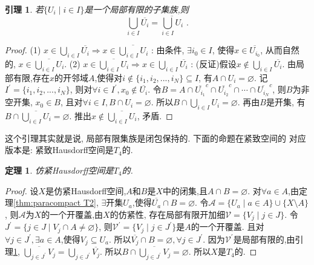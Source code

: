 \documentclass[a4paper,UTF8]{ctexart}
\newtheorem{thm}[theorem]{定理} %
\newtheorem{lemma}[theorem]{引理}
\begin{document}
\begin{lemma} \label{lemma:local finite close union}
  若$\{ U_i \mid i \in I\}$是一个局部有限的子集族,则
  \[
    \bigcup_{i \in I}\overline{U_i} = \overline{\bigcup_{i \in I}U_i} \,\,.
  \]
\end{lemma}
\begin{proof}
  (1) $x \in \bigcup_{i \in I}\overline{U_i} \Longrightarrow x \in \overline{\bigcup_{i \in I}U_i}\,\,$:
  由条件, $\exists i_0 \in I$, 使得$x \in \overline{U_{i_0}}$,
  从而自然的, $x \in \overline{\bigcup_{i \in I}U_i}$.\newline
  (2) $x \in \overline{\bigcup_{i \in I}U_i} \Longrightarrow x \in \bigcup_{i \in I}\overline{U_i}\,\,$:
  (反证)假设$x \notin \bigcup_{i \in I}\overline{U_i}$.
  由局部有限,存在$x$的开邻域$A$,使得对$i \notin \{i_1, i_2, ..., i_N \} \subseteq I$,
  有$A \cap U_i = \varnothing$. 记$I^{'} = \{i_1, i_2, ..., i_N \}$,
  则对$\forall i \in I^{'}, x_0 \notin \overline{U_i}$. 
  令$B = A \cap \overline{U_{i_1}}^c \cap \overline{U_{i_2}}^c \cap \cdots \cap \overline{U_{i_N}}^c$,
  则$B$为非空开集, $x_0 \in B$, 且对$\forall i \in I, B \cap U_i = \varnothing$.
  所以$B \cap \bigcup_{i \in I} U_i = \varnothing$.
  再由$B$是开集, 有$B \cap \overline{\bigcup_{i \in I} U_i} = \varnothing$.
  推出$x \notin \overline{\bigcup_{i \in I} U_i}$, 矛盾.
\end{proof}

这个引理其实就是说, 局部有限集族是闭包保持的. 下面的命题在紧致空间的
对应版本是: 紧致Hausdorff空间是$T_4$的.

\begin{thm}
  仿紧Hausdorff空间是$T_4$的.
\end{thm}
\begin{proof}
  设$X$是仿紧Hausdorff空间,$A$和$B$是$X$中的闭集,且$A \cap B = \varnothing$.
  对$\forall a \in A$,由定理\ref{thm:paracompact T2},
  $\exists$开集$U_a$,使得$\overline{U_a} \cap B = \varnothing$.
  令$\mathscr{A} = \{ U_a \mid a \in A \} \cup \{ X \setminus A \}$,
  则$\mathscr{A}$为$X$的一个开覆盖,由$X$的仿紧性,
  存在局部有限开加细$\mathscr{V} = \{ V_j \mid j \in J \}$.
  令$J^{'} = \{ j \in J \mid V_j \cap A \neq \varnothing \}$,
  则$\mathscr{V}^{'} = \{ V_j \mid j \in J^{'} \}$是$A$的一个开覆盖.
  且对$\forall j \in J^{'}, \exists a \in A$,使得$V_j \subseteq U_a$.
  所以$\overline{V_j} \cap B = \varnothing, \forall j \in J^{'}$.
  因为$\mathscr{V}^{'}$是局部有限的,由引理\ref{lemma:local finite close union},
  $\overline{\bigcup_{j \in J^{'}}V_j} = \bigcup_{j \in J^{'}} \overline{V_j}$.
  所以$B \cap \overline{\bigcup_{j \in J^{'}}V_j} = \varnothing$.
  所以$X$是$T_4$的.
\end{proof}
\end{document}
